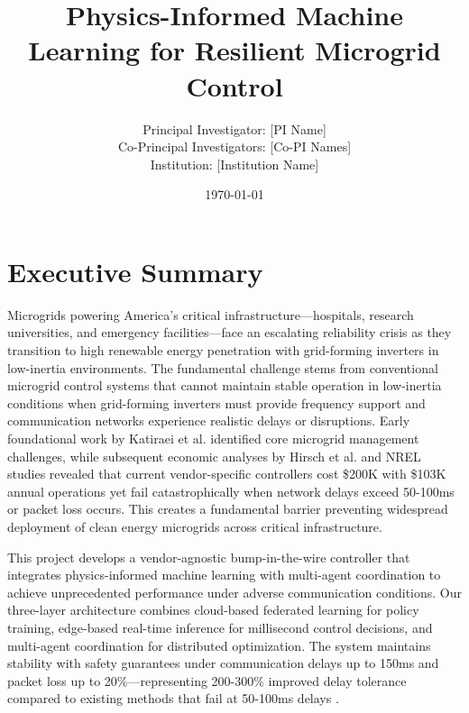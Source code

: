\documentclass[12pt]{article}
\begin{document}
\title{\Large\textbf{Physics-Informed Machine Learning for Resilient Microgrid Control}}


\author{Principal Investigator: [PI Name]\\
Co-Principal Investigators: [Co-PI Names]\\
Institution: [Institution Name]}

\date{\today}

\maketitle

\section{Executive Summary}

Microgrids powering America's critical infrastructure---hospitals, research universities, and emergency facilities---face an escalating reliability crisis as they transition to high renewable energy penetration with grid-forming inverters in low-inertia environments. The fundamental challenge stems from conventional microgrid control systems that cannot maintain stable operation in low-inertia conditions when grid-forming inverters must provide frequency support and communication networks experience realistic delays or disruptions. Early foundational work by Katiraei et al. \cite{katiraei2008} identified core microgrid management challenges, while subsequent economic analyses by Hirsch et al. \cite{hirsch2018} and NREL studies \cite{sigrin2019} revealed that current vendor-specific controllers cost \$200K with \$103K annual operations yet fail catastrophically when network delays exceed 50-100ms or packet loss occurs. This creates a fundamental barrier preventing widespread deployment of clean energy microgrids across critical infrastructure.

This project develops a vendor-agnostic bump-in-the-wire controller that integrates physics-informed machine learning with multi-agent coordination to achieve unprecedented performance under adverse communication conditions. Our three-layer architecture combines cloud-based federated learning for policy training, edge-based real-time inference for millisecond control decisions, and multi-agent coordination for distributed optimization. The system maintains stability with safety guarantees under communication delays up to 150ms and packet loss up to 20\%—representing 200-300\% improved delay tolerance compared to existing methods that fail at 50-100ms delays \cite{baseline2023delay}.
\end{document}
